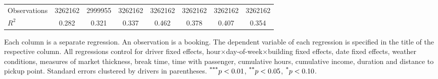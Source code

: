 \documentclass[reviewmode,AEJ]{AEA}
\begin{document}
\begin{table}[]
{\begin{tabularx}{\textwidth}{p{3.8cm}*{7}{S[table-format = 0.4, table-space-text-pre={**}, table-space-text-post={-**}]}}
        Observations        &\num{3262162}         &\num{2999955}         &\num{3262162}         &\num{3262162}         &\num{3262162}         &\num{3262162}         &\num{3262162}         \\
        \(R^2\)             & \num{0.282}         & \num{0.321}         & \num{0.337}         & \num{0.462}         & \num{0.378}         & \num{0.407}         & \num{0.354}         \\
        \bottomrule
		\end{tabularx}
		}
		\begin{tablenotes}
	    	\small
			Each column is a separate regression. An observation is a booking. The dependent variable of each regression is specified in the title of the respective column. All regressions control for driver fixed effects, hour\(\times\)day-of-week\(\times\)building fixed effects, date fixed effects, weather conditions, measures of market thickness, break time, time with passenger, cumulative hours, cumulative income, duration and distance to pickup point. Standard errors clustered by drivers in parentheses. $\textsuperscript{***}p < 0.01$, $\textsuperscript{**}p < 0.05$, $\textsuperscript{*}p < 0.10$.  
		\end{tablenotes}

    \hfill



\end{table}
\end{document}
